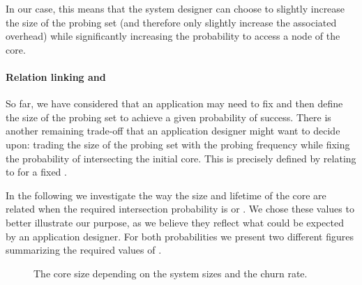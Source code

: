 \documentclass[]{llncs}
\begin{document}
In our case, this means that  the system designer 
can choose to slightly increase the size of the probing set  (and 
therefore  only slightly increase the associated overhead)
while significantly increasing the probability to access a node of the core.



\paragraph{Relation linking  and }

So far, we have considered that an application may need to fix  and 
then define the size of the probing set to achieve a given probability  of 
success. There is another remaining trade-off that an application designer
might want to decide upon:  trading the size of the probing set with the
probing frequency while fixing the probability 
of intersecting the initial core. This is precisely defined by relating 
 to  for a fixed .

In the following we investigate the way the size and lifetime of the core
are related when the required intersection probability is 
 or  .  We chose these values to better illustrate our purpose,
as we believe they reflect what could be expected by an application
designer.  For both  probabilities we present two different figures summarizing
the required  values of  . 





\begin{figure}[!ht]
 \centering
\caption{The core size depending on the system sizes and the churn rate.}
 \label{fig:tabular}
\end{figure} 
\end{document}

